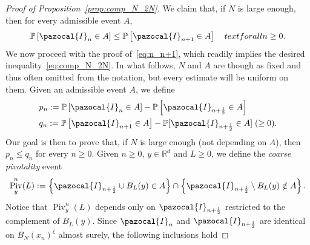 \documentclass[AHL,Unicode,longabstracts,published]{cedram}
\DeclareMathOperator{\Piv}{Piv}
\renewcommand{\P}{\mathbb{P}}
\newcommand{\R}{\mathbb{R}}
\newcommand{\sfc}{\mathsf{c}}
\newcommand{\R}{\mathbb{R}}
\begin{document}
\begin{proof}[Proof of Proposition~\ref{prop:comp_N_2N}]
We claim that, if $N$ is large enough, then for every admissible event $A$,
\begin{equation}\label{eq:n_n+1}
\P\left[\pazocal{I}_n\in A\right] \leq \P\left[\pazocal{I}_{n+1}\in A\right]\quad text{for all } n\geq0.
\end{equation}
We now proceed with the proof of~\eqref{eq:n_n+1}, which readily implies the desired inequality~\eqref{eq:comp_N_2N}. In what follows, $N$ and $A$ are though as fixed and thus often omitted from the notation, but every estimate will be uniform on them. Given an admissible event $A$, we define
\begin{align}
&p_n:=\P\left[\pazocal{I}_n\in A\right]-\P\left[\pazocal{I}_{n+\frac12}\in A\right]\label{eq:def_p_n}\\
&q_n:=\P\left[\pazocal{I}_{n+1}\in A\right]-\P[\pazocal{I}_{n+\frac12}\in A]\;(\geq0).\label{eq:def_q_n}
\end{align}
Our goal is then to prove that, if $N$ is large enough (not depending on $A$), then $p_n\leq q_n$ for every $n\geq0$. Given $n\geq0$, $y\in\R^d$ and $L\geq0$, we define the \emph{coarse pivotality} event
\begin{equation}\label{eq:piv_def1}
\Piv^{n}_{y}(L):=\left\{\pazocal{I}_{n+\frac12}\cup B_{L}(y) \in A\right\}\cap \left
\{\pazocal{I}_{n+\frac12}\setminus B_{L}(y) \notin A\right\}.
\end{equation}
Notice that $\Piv^{n}_{y}(L)$ depends only on $\pazocal{I}_{n+\frac12}$ restricted to the complement of $B_L(y)$. Since $\pazocal{I}_n$ and $\pazocal{I}_{n+\frac12}$ are identical on $B_{N}(x_n)^{\sfc}$ almost surely, the following inclusions hold


\end{proof}
\end{document}
